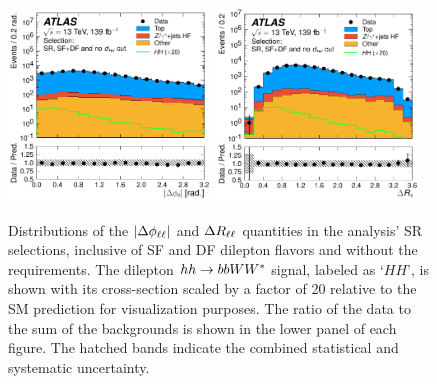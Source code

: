 \begin{figure}[!htb]
    \begin{center}
        \includegraphics[width=0.48\textwidth]{figures/search_hh/results/sr_plots/srIncNoDhh_dphi_ll}
        \includegraphics[width=0.48\textwidth]{figures/search_hh/results/sr_plots/srIncNoDhh_dRll}
        \caption{
            Distributions of the $|\Delta \phi_{\ell\ell}|$ and $\Delta R_{\ell\ell}$ quantities in the analysis' SR selections,
            inclusive of SF and DF dilepton flavors and without the \dhh requirements.
            The dilepton $hh \rightarrow bbWW^*$ signal, labeled as `$HH$', is shown with its cross-section scaled
            by a factor of 20 relative to the SM prediction for visualization purposes.
            The ratio of the data to the sum of the backgrounds is shown in the lower panel of each figure.
            The hatched bands indicate the combined statistical and systematic uncertainty.
        }
        \label{fig:hh_sr_kin_3}
    \end{center}
\end{figure}

